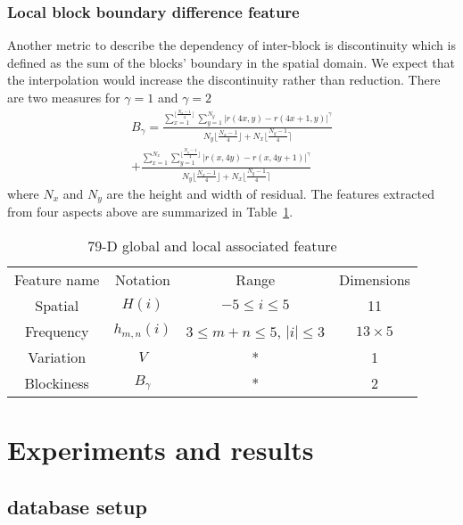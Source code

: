 \documentclass[pdftex,twocolumn,epjc3]{svjour3}          %
\begin{document}
\subsubsection{Local block boundary difference feature}
Another metric to describe the dependency of inter-block is discontinuity which is defined as the sum of the blocks' boundary in the spatial domain. We expect that the interpolation would increase the discontinuity rather than reduction. There are two measures for $\gamma=1$ and $\gamma=2$
\begin{multline}
B_{\gamma}=\frac{\sum_{x=1}^{\lfloor \frac{N_x-1}{4} \rfloor} \sum_{y=1}^{ N_y }|r(4x,y)-r(4x+1,y)|^{\gamma}}{N_y \lfloor \frac{N_x-1}{4} \rfloor + N_x \lfloor \frac{N_y-1}{4} \rceil} \\
+\frac{\sum_{x=1}^{N_x} \sum_{y=1}^{\lfloor \frac{ N_y -1}{4} \rfloor}|r(x,4y)-r(x,4y+1)|^{\gamma}}{N_y \lfloor \frac{N_x-1}{4} \rfloor + N_x \lfloor \frac{N_y-1}{4} \rceil}
\end{multline}
where $N_x$ and $N_y$ are the height and width of residual. The features extracted from four aspects above are summarized in Table~\ref{table:1}.

\begin{table}[t]
\renewcommand{\arraystretch}{1.3}
\caption{79-D global and local associated feature}
\label{table:1}
\begin{tabular}{cccc}
\hline
Feature name & Notation & Range & Dimensions\\
\noalign{\smallskip}\hline\noalign{\smallskip}
Spatial & $H(i)$ & $-5\leq i \leq5$ & 11\\
Frequency & $h_{m,n}(i)$ & $3\leq m+n \leq5$, $\left| i \right| \leq3$ & $13\times5$\\
Variation & $V$ & * & 1\\
Blockiness & $B_{\gamma}$ & * & 2\\
\hline
\end{tabular}
\end{table}

\section{Experiments and results}
\label{sec:experiments}
\subsection{database setup}
\end{document}
